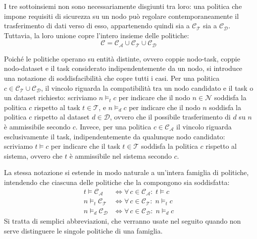 I tre sottoinsiemi non sono necessariamente disgiunti tra loro: una politica che impone requisiti di sicurezza su un nodo può regolare contemporaneamente il trasferimento di dati verso di esso, appartenendo quindi sia a $\mathcal{C_T}$ sia a $\mathcal{C_D}$. Tuttavia, la loro unione copre l'intero insieme delle politiche:
\begin{equation}
    \mathcal{C} = \mathcal{C_A} \cup \mathcal{C_T} \cup \mathcal{C_D}
\end{equation}

Poiché le politiche operano su entità distinte, ovvero coppie nodo-task, coppie nodo-dataset e il task considerato indipendentemente da un nodo, si introduce una notazione di soddisfacibilità che copre tutti i casi. Per una politica $c \in \mathcal{C_T} \cup \mathcal{C_D}$, il vincolo riguarda la compatibilità tra un nodo candidato e il task o un dataset richiesto: scriviamo $n \models_t c$ per indicare che il nodo $n \in \mathcal{N}$ soddisfa la politica $c$ rispetto al task $t \in \mathcal{T}$, e $n \models_d c$ per indicare che il nodo $n$ soddisfa la politica $c$ rispetto al dataset $d \in \mathcal{D}$, ovvero che il possibile trasferimento di $d$ su $n$ è ammissibile secondo $c$. Invece, per una politica $c \in \mathcal{C_A}$ il vincolo riguarda esclusivamente il task, indipendentemente da qualunque nodo candidato: scriviamo $t \models c$ per indicare che il task $t \in \mathcal{T}$ soddisfa la politica $c$ rispetto al sistema, ovvero che $t$ è ammissibile nel sistema secondo $c$.

La stessa notazione si estende in modo naturale a un'intera famiglia di politiche, intendendo che ciascuna delle politiche che la compongono sia soddisfatta:
\begin{align}
    t \models \mathcal{C_A} &\iff \forall\, c \in \mathcal{C_A} :\; t \models c \\
    n \models_t \mathcal{C_T} &\iff \forall\, c \in \mathcal{C_T} :\; n \models_t c \\
    n \models_d \mathcal{C_D} &\iff \forall\, c \in \mathcal{C_D} :\; n \models_d c
\end{align}
Si tratta di semplici abbreviazioni, che verranno usate nel seguito quando non serve distinguere le singole politiche di una famiglia.

